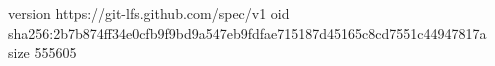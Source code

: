 version https://git-lfs.github.com/spec/v1
oid sha256:2b7b874ff34e0cfb9f9bd9a547eb9fdfae715187d45165c8cd7551c44947817a
size 555605
